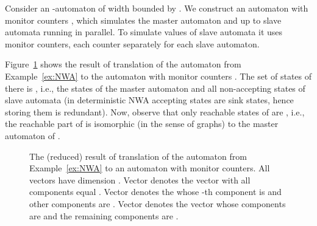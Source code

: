 \documentclass{lmcs}
\begin{document}
\begin{exa}
Consider an -automaton  of width bounded by .
We construct an automaton with monitor counters , which
simulates the master automaton and up to  slave automata running in parallel.
To simulate values of slave automata it uses monitor counters, each counter separately for each slave automaton.

Figure~\ref{fig:NWAtoAMC} shows the result of translation of  the automaton  from Example~\ref{ex:NWA}
to the automaton with monitor counters . The set of states of  there is
, i.e.,
the states of the master automaton and all non-accepting states of slave automata (in deterministic NWA accepting states are sink states, hence storing them is redundant).
Now, observe that only reachable states of  are , i.e., the reachable part of
 is isomorphic (in the sense of graphs) to the master automaton of .

\begin{figure}
\centering
{}
\caption{The (reduced) result of translation of the automaton  from  Example~\ref{ex:NWA} to an automaton with monitor counters. All vectors have dimension .
Vector  denotes the vector with all components equal .
Vector  denotes the whose -th component is  and other components are .
Vector  denotes the vector whose components  are  and the remaining components are .
}\label{fig:NWAtoAMC}
\end{figure}
\end{exa}
\end{document}
